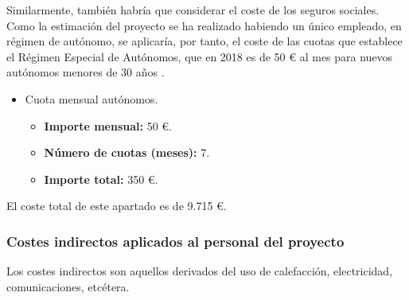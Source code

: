 \documentclass[twoside]{report}
\begin{document}
Similarmente, también habría que considerar el coste de los seguros sociales. Como la estimación del proyecto se ha realizado  habiendo un único empleado, en régimen de autónomo, se aplicaría, por tanto, el coste de las cuotas que establece el Régimen Especial de Autónomos, que en 2018 es de 50 \euro \vspace{0.1cm} al mes para nuevos autónomos menores de 30 años \cite{segsocialautonomos}.

\begin{itemize}
\item Cuota mensual autónomos.
	\begin{itemize}
	\item \textbf{Importe mensual:} 50 \euro.
	\item \textbf{Número de cuotas (meses): } 7.
	\item \textbf{Importe total: } 350 \euro.
	\end{itemize}
\end{itemize}

El coste total de este apartado es de 9.715 \euro.

\subsubsection{Costes indirectos aplicados al personal del proyecto}

Los costes indirectos son aquellos derivados del uso de calefacción, electricidad, comunicaciones, etcétera.
\end{document}
